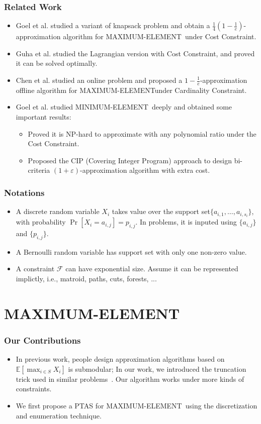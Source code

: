\documentclass{beamer}
\newcommand{\calF}{{\mathcal F}}
\newcommand{\Exp}{{\mathbb{E}}}
\newcommand{\MM}{{\textsf{MAXIMUM-ELEMENT}}}
\newcommand{\mm}{{\textsf{MINIMUM-ELEMENT}}}
\newcommand{\etal}{et al. }
\begin{document}
\begin{frame}
\frametitle{Related Work}
\begin{itemize}
    \item Goel \etal studied a variant of knapsack problem and obtain a $\frac{1}{4}(1 - \frac{1}{e})$-approximation algorithm for \MM\ under Cost Constraint.\cite{Goel:asking}
    \item Guha \etal studied the Lagrangian version with Cost Constraint, and proved it can be solved optimally.\cite{Guha07informationacquisition}
    \item Chen \etal studied an online problem and proposed a $1-\frac{1}{e}$-approximation offline algorithm for \MM under Cardinality Constraint.\cite{NIPS2016:MAB}
    \item Goel \etal studied \mm\ deeply and obtained some important results:\cite{Goel:probe}
    \begin{itemize}
        \item Proved it is NP-hard to approximate with any polynomial ratio under the Cost Constraint.
        \item Proposed the CIP (Covering Integer Program) approach to design bi-criteria $(1+\varepsilon)$-approximation algorithm with extra cost.
    \end{itemize}
\end{itemize}
\end{frame}

\begin{frame}
    \frametitle{Notations}
    \begin{itemize}
        \item A discrete random variable $X_i$ takes value over the support set$\{a_{i,1}, \ldots, a_{i, s_i}\}$, with probability $\Pr[X_i = a_{i,j}] = p_{i,j}$. In problems, it is inputed using $\{a_{i,j}\}$ and $\{p_{i,j}\}$.
        \item A Bernoulli random variable has support set with only one non-zero value.
        \item A constraint $\calF$ can have exponential size. Assume it can be represented implictly, i.e., matroid, paths, cuts, forests, ...
    \end{itemize}
\end{frame}

\section{MAXIMUM-ELEMENT}

\begin{frame}
\frametitle{Our Contributions}
\begin{itemize}
    \item In previous work, people design approximation algorithms based on $\Exp[\max_{i\in S} X_i]$ is submodular; In our work, we introduced the truncation trick used in similar problems~\cite{kleinberg2000allocating,guha2009exceeding}. Our algorithm works under more kinds of constraints.
    \item We first propose a PTAS for \MM\ using the discretization and enumeration technique.
\end{itemize}
\end{frame}
\end{document}
